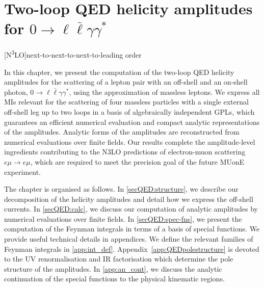 \documentclass[main.tex]{subfiles}
\begin{document}
\chapter{Two-loop QED helicity amplitudes for $0\to\ell \bar\ell \gamma \gamma^*$} \label{sec:QEDpaper}
\begin{acronym}
    [N\textsuperscript{3}LO]{next-to-next-to-next-to-leading order}
\end{acronym}

In this chapter, we present the computation of the two-loop QED helicity amplitudes for the scattering of a lepton pair with an off-shell and an on-shell photon, $0\to\ell \bar\ell \gamma \gamma^*$, using the approximation of massless leptons. We express all MIs relevant for the scattering of four massless particles with a single external off-shell leg up to two loops in a basis of algebraically independent GPLs, which guarantees an efficient numerical evaluation and compact analytic representations of the amplitudes. Analytic forms of the amplitudes are reconstructed from numerical evaluations over finite fields. Our results complete the amplitude-level ingredients contributing to the \acs{N3LO} predictions of electron-muon scattering $e\mu\to e\mu$, which are required to meet the precision goal of the future MUonE experiment.

The chapter is organised as follows. In \cref{secQED:structure}, we describe our decomposition of the helicity amplitudes and detail how we express the off-shell currents. In \cref{secQED:calc}, we discuss our computation of analytic amplitudes by numerical evaluations over finite fields. In \cref{secQED:spec-fns}, we present the computation of the Feynman integrals in terms of a basis of special functions. We provide useful technical details in appendices. We define the relevant families of Feynman integrals in \cref{app:int_def}. 
Appendix~\cref{app:QEDpolestructure} is devoted to the UV renormalisation and IR factorisation which determine the pole structure of the amplitudes. In \cref{app:an_cont}, we discuss the analytic continuation of the special functions to the physical kinematic regions.
\end{document}
